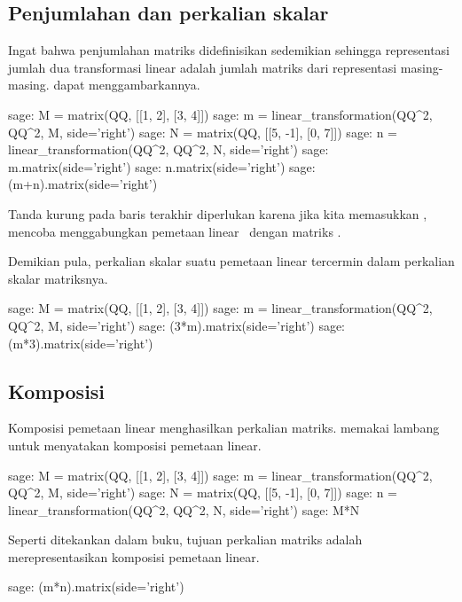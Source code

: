 \subsection{Penjumlahan dan perkalian skalar}
Ingat bahwa penjumlahan matriks didefinisikan sedemikian sehingga representasi
jumlah dua transformasi linear adalah jumlah matriks dari representasi
masing-masing. \Sage{} dapat menggambarkannya.
\begin{sagecommandline}
sage: M = matrix(QQ, [[1, 2], [3, 4]])
sage: m = linear_transformation(QQ^2, QQ^2, M, side='right')
sage: N = matrix(QQ, [[5, -1], [0, 7]])
sage: n = linear_transformation(QQ^2, QQ^2, N, side='right')
sage: m.matrix(side='right')
sage: n.matrix(side='right')
sage: (m+n).matrix(side='right')
\end{sagecommandline}
Tanda kurung pada baris terakhir diperlukan karena jika kita memasukkan
, \Sage{} mencoba menggabungkan pemetaan
linear~ dengan matriks .

Demikian pula, perkalian skalar suatu pemetaan linear tercermin dalam
perkalian skalar matriksnya.
\begin{sagecommandline}
sage: M = matrix(QQ, [[1, 2], [3, 4]])
sage: m = linear_transformation(QQ^2, QQ^2, M, side='right')
sage: (3*m).matrix(side='right')
sage: (m*3).matrix(side='right')
\end{sagecommandline}



\subsection{Komposisi}
Komposisi pemetaan linear menghasilkan perkalian matriks.
\Sage{} memakai lambang \inlinecode{*} untuk menyatakan komposisi pemetaan linear.
\begin{sagecommandline}
sage: M = matrix(QQ, [[1, 2], [3, 4]])
sage: m = linear_transformation(QQ^2, QQ^2, M, side='right')
sage: N = matrix(QQ, [[5, -1], [0, 7]])
sage: n = linear_transformation(QQ^2, QQ^2, N, side='right')
sage: M*N
\end{sagecommandline}

Seperti ditekankan dalam buku, tujuan perkalian matriks adalah
merepresentasikan komposisi pemetaan linear.
\begin{sagecommandline}
sage: (m*n).matrix(side='right')
\end{sagecommandline}




\endinput


TODO:
